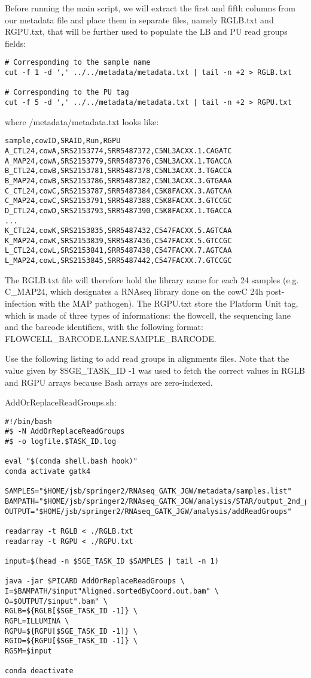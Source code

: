 Before running the main script, we will extract the first and fifth columns from our metadata file and place them in separate files, namely RGLB.txt and  RGPU.txt, that will be further used to populate the LB and PU read groups fields:

\begin{verbatim}
# Corresponding to the sample name
cut -f 1 -d ',' ../../metadata/metadata.txt | tail -n +2 > RGLB.txt

# Corresponding to the PU tag 
cut -f 5 -d ',' ../../metadata/metadata.txt | tail -n +2 > RGPU.txt
\end{verbatim}

where /metadata/metadata.txt looks like:

\begin{verbatim}
sample,cowID,SRAID,Run,RGPU
A_CTL24,cowA,SRS2153774,SRR5487372,C5NL3ACXX.1.CAGATC
A_MAP24,cowA,SRS2153779,SRR5487376,C5NL3ACXX.1.TGACCA
B_CTL24,cowB,SRS2153781,SRR5487378,C5NL3ACXX.3.TGACCA
B_MAP24,cowB,SRS2153786,SRR5487382,C5NL3ACXX.3.GTGAAA
C_CTL24,cowC,SRS2153787,SRR5487384,C5K8FACXX.3.AGTCAA
C_MAP24,cowC,SRS2153791,SRR5487388,C5K8FACXX.3.GTCCGC
D_CTL24,cowD,SRS2153793,SRR5487390,C5K8FACXX.1.TGACCA
...
K_CTL24,cowK,SRS2153835,SRR5487432,C547FACXX.5.AGTCAA
K_MAP24,cowK,SRS2153839,SRR5487436,C547FACXX.5.GTCCGC
L_CTL24,cowL,SRS2153841,SRR5487438,C547FACXX.7.AGTCAA
L_MAP24,cowL,SRS2153845,SRR5487442,C547FACXX.7.GTCCGC
\end{verbatim}


The RGLB.txt file will therefore hold the library name for each 24 samples (e.g. C\_MAP24, which designates a RNAseq library done on the cowC 24h post-infection with the MAP pathogen). The RGPU.txt store the Platform Unit tag, which is made of three types of informations: the flowcell, the sequencing lane and the barcode identifiers, with the following format: {FLOWCELL\_BARCODE}.{LANE}.{SAMPLE\_BARCODE}. 


Use the following listing to add read groups in alignments files. Note that the value given by \$SGE\_TASK\_ID -1 was used to fetch the correct values in RGLB and RGPU arrays because Bash arrays are zero-indexed.

\noindent AddOrReplaceReadGroups.sh:
\begin{verbatim}
#!/bin/bash
#$ -N AddOrReplaceReadGroups
#$ -o logfile.$TASK_ID.log

eval "$(conda shell.bash hook)"
conda activate gatk4

SAMPLES="$HOME/jsb/springer2/RNAseq_GATK_JGW/metadata/samples.list"
BAMPATH="$HOME/jsb/springer2/RNAseq_GATK_JGW/analysis/STAR/output_2nd_pass"
OUTPUT="$HOME/jsb/springer2/RNAseq_GATK_JGW/analysis/addReadGroups"

readarray -t RGLB < ./RGLB.txt
readarray -t RGPU < ./RGPU.txt

input=$(head -n $SGE_TASK_ID $SAMPLES | tail -n 1)

java -jar $PICARD AddOrReplaceReadGroups \
I=$BAMPATH/$input"Aligned.sortedByCoord.out.bam" \
O=$OUTPUT/$input".bam" \
RGLB=${RGLB[$SGE_TASK_ID -1]} \
RGPL=ILLUMINA \
RGPU=${RGPU[$SGE_TASK_ID -1]} \
RGID=${RGPU[$SGE_TASK_ID -1]} \
RGSM=$input

conda deactivate
\end{verbatim}

